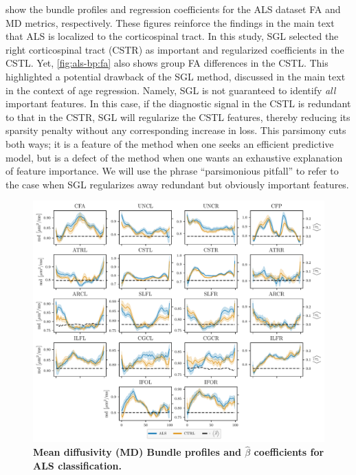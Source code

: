 \documentclass[10pt,%
               aps,%
               prl,%
               preprint,%
               superscriptaddress,%
               preprintnumbers,%
               amsmath,%
               floatfix,%
               endfloats*]{revtex4-2}
\begin{document}
 show the bundle profiles and regression
coefficients for the ALS dataset FA and MD metrics, respectively. These
figures reinforce the findings in the main text that ALS is localized to the
corticospinal tract. In this study, SGL selected the right corticospinal
tract (CSTR) as important and regularized coefficients in the CSTL. Yet,
\cref{fig:als-bp:fa} also shows group FA differences in the CSTL. This
highlighted a potential drawback of the SGL method, discussed in the main
text in the context of age regression. Namely, SGL is not guaranteed to
identify \emph{all} important features. In this case, if the diagnostic
signal in the CSTL is redundant to that in the CSTR, SGL will regularize the
CSTL features, thereby reducing its sparsity penalty without any
corresponding increase in loss. This parsimony cuts both ways; it is a
feature of the method when one seeks an efficient predictive model, but is a
defect of the method when one wants an exhaustive explanation of feature
importance. We will use the phrase ``parsimonious pitfall'' to refer to the
case when SGL regularizes away redundant but obviously important features.

\begin{figure}
    \includegraphics[width=\textwidth]{sarica_coefs_profiles_md.pdf}
    \caption{%
        {%
            \bf Mean diffusivity (MD) Bundle profiles and $\hat{\beta}$
            coefficients for ALS classification.
        }
        \label{fig:als-bp:md}
    }
\end{figure}
\end{document}
